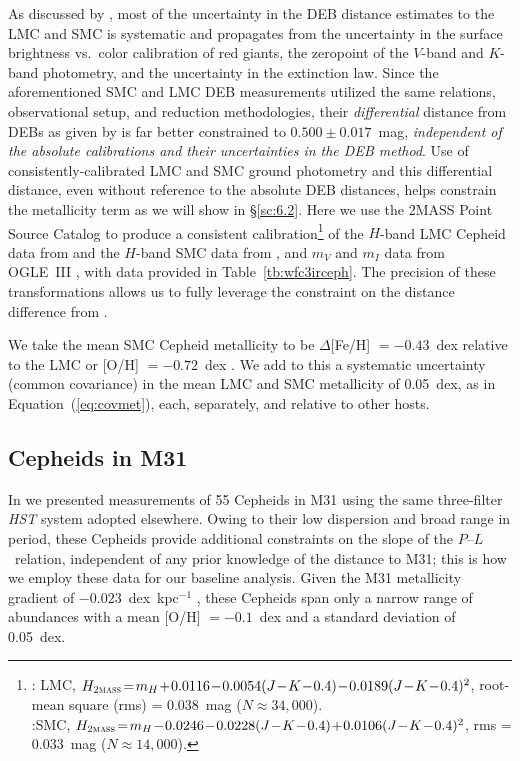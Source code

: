 \documentclass[12pt]{aastex631}
\newcommand{\PLs}{$P$--$L$\ }
\begin{document}
As discussed by \citet{Graczyk:2020}, most of the uncertainty in the DEB distance estimates to the LMC and SMC is systematic and propagates from the uncertainty in the surface brightness vs.~color calibration of red giants, the zeropoint of the $V$-band and $K$-band photometry, and the uncertainty in the extinction law. Since the aforementioned SMC and LMC DEB measurements utilized the same relations, observational setup, and reduction methodologies, their {\it differential} distance from DEBs as given by \citet{Graczyk:2020} is far better constrained to $0.500\pm 0.017$~mag, {\it independent of the absolute calibrations and their uncertainties in the DEB method}. Use of consistently-calibrated LMC and SMC ground photometry and this differential distance, even without reference to the absolute DEB distances, helps constrain the metallicity term as we will show in \S\ref{sc:6.2}.  Here we use the 2MASS Point Source Catalog \citep{Cutri:2003} to produce a consistent calibration\footnote{\citet{Macri:2015}: LMC, $H_{\textsc{2mass}}\!=\!m_H\!+\!0.0116\!-\!0.0054(J\!-\!K\!-\!0.4)\!-\!0.0189(J\!-\!K\!-\!0.4)^2$, root-mean square (rms) = 0.038~mag ($N\approx 34,000$).\\\citet{Kato:2007}:SMC, \hspace{0.09in}$H_{\textsc{2mass}}\!=\!m_H\!-\!0.0246\!-\!0.0228(J\!-\!K\!-\!0.4)\!+\!0.0106(J\!-\!K\!-\!0.4)^2$, rms = 0.033~mag ($N\approx 14,000$).} of the $H$-band LMC Cepheid data from \citet{Macri:2015}  and the $H$-band SMC data from \citet{Kato:2007}, and $m_V$ and $m_I$ data from OGLE~III \citep{Soszynski:2008}, with data provided in Table~\ref{tb:wfc3irceph}.  The precision of these transformations allows us to fully leverage the constraint on the distance difference from  \citet{Graczyk:2020}.

We take the mean SMC Cepheid metallicity to be $\Delta$[Fe/H] $=-0.43$~dex relative to the LMC or [O/H] $=-0.72$~dex \citep{Romaniello:2021,Romaniello:2008}. We add to this a systematic uncertainty (common covariance) in the mean LMC and SMC metallicity of 0.05~dex, as in Equation~(\ref{eq:covmet}), each, separately, and relative to other hosts.

\subsection{Cepheids in M31\label{sc:4.5}}
  
In \citet{Li:2021} we presented measurements of 55 Cepheids in M31 using the same three-filter {\it HST} system adopted elsewhere. Owing to their low dispersion and broad range in period, these Cepheids provide additional constraints on the slope of the \PLs relation, independent of any prior knowledge of the distance to M31; this is how we employ these data for our baseline analysis. Given the M31 metallicity gradient of $-0.023$~dex~kpc$^{-1}$ \citep{Zurita:2012}, these Cepheids span only a narrow range of abundances with a mean [O/H] $=-0.1$~dex and a standard deviation of 0.05~dex.
   
\end{document}
